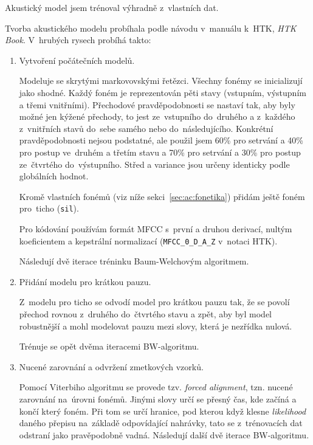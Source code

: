 Akustický model jsem trénoval výhradně z~vlastních dat.

Tvorba akustického modelu probíhala podle návodu v~manuálu k~HTK, \textit{HTK
Book}. V~hrubých rysech probíhá takto:

\begin{enumerate}

\item{Vytvoření počátečních modelů.}

Modeluje se skrytými markovovskými řetězci. Všechny fonémy se inicializují jako
shodné. Každý foném je reprezentován pěti stavy (vstupním, výstupním a třemi
vnitřními). Přechodové pravděpodobnosti se nastaví tak, aby byly možné jen
kýžené přechody, to jest ze~vstupního do~druhého a z~každého z~vnitřních stavů
do~sebe samého nebo do~následujícího. Konkrétní pravděpodobnosti nejsou
podstatné, ale použil jsem 60\% pro setrvání a 40\% pro postup ve~druhém a
třetím stavu a 70\% pro setrvání a 30\% pro postup ze~čtvrtého do~výstupního.
Střed a variance jsou určeny identicky podle globálních hodnot.

Kromě vlastních fonémů (viz níže sekci~\ref{sec:ac:fonetika}) přidám ještě foném
pro~ticho (\texttt{sil}).

Pro kódování používám formát MFCC s~první a druhou derivací, nultým koeficientem
a kepstrální normalizací (\texttt{MFCC\_0\_D\_A\_Z} v~notaci HTK).

Následují dvě iterace tréninku Baum-Welchovým algoritmem\cite{welch2003hidden}.

\item{Přidání modelu pro krátkou pauzu.}

Z~modelu pro ticho se odvodí model pro krátkou pauzu tak, že se povolí přechod
rovnou z~druhého do~čtvrtého stavu a zpět, aby byl model robustnější a mohl
modelovat pauzu mezi slovy, která je nezřídka nulová.

Trénuje se opět dvěma iteracemi BW-algoritmu.

\item{Nucené zarovnání a odvržení zmetkových vzorků.}

Pomocí Viterbiho algoritmu\cite{forney1973viterbi} se provede tzv.
\textit{forced alignment}, tzn. nucené zarovnání na~úrovni fonémů. Jinými slovy
určí se přesný čas, kde začíná a končí který foném. Při tom se určí hranice, pod
kterou když klesne \textit{likelihood} daného přepisu na~základě odpovídající
nahrávky, tato se z~trénovacích dat odstraní jako pravěpodobně vadná. Následují
další dvě iterace BW-algoritmu.


\end{enumerate}
